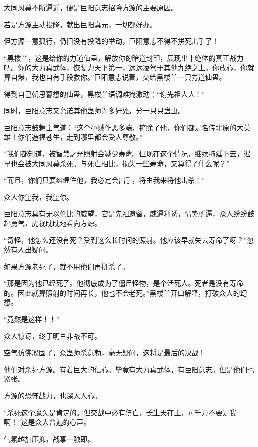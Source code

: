 
\begin{this_body}

大同风幕不断逼近，便是巨阳意志招降方源的主要原因。

若是方源主动投降，献出巨阳真元，一切都好办。

但方源一意孤行，仍旧没有投降的举动，巨阳意志不得不拼死出手了！

“黑楼兰，这是给你的力道仙蛊，解放你的暗道封印，展现出十绝体的真正战力吧。你的大力真武体，恢复力天下第一，远远凌驾于其他九绝之上。你放心，你就算自爆，我也自有手段救你。”巨阳意志说着，交给黑楼兰一只力道仙蛊。

得到自己朝思暮想的仙蛊，黑楼兰语调难掩激动：“谢先祖大人！”

同时，巨阳意志又允诺其他蛊师许多好处，分一只只蛊虫。

巨阳意志鼓舞士气道：“这个小贼作恶多端，铲除了他，你们都是名传北原的大英雄！你们造福苍生，走到哪里都会受人尊敬。”

“我们都知道，被智慧之光照射会减少寿命。但现在这个情况，继续拖延下去，迟早也会被大同风幕杀死。与死亡相比，损失一些寿命，又算得了什么呢？”

“而且，你们只要纠缠住他，我必定会出手，将由我来将他击杀！”

众人你望我，我望你。

巨阳意志具有无以伦比的威望，它是先祖遗留，威逼利诱，情势所逼，众人纷纷鼓起勇气，虎视眈眈地看向方源。

“奇怪，他怎么还没有死？受到这么长时间的照射。他应该早就失去寿命了呀？”忽然有人出疑问。

如果方源老死了，就不用他们再拼杀了。

“那是因为他已经死了。他彻底成为了僵尸怪物，是个活死人。死者是没有寿命的。因此就算照射的时间再长，他也不会老死。”黑楼兰开口解释，打破众人的幻想。

“竟然是这样！！”

众人惊讶，终于明白非战不可。

空气仿佛凝固了，众蛊师杀意勃，毫无疑问，这将是最后的决战！

他们对杀死方源。有着巨大的信心。毕竟有大力真武体，有巨阳意志。但是他们也紧张。

方源的恐怖战力，也深入人心。

“杀死这个魔头是肯定的。但交战中必有伤亡，长生天在上，可千万不要是我啊！”这是众人普遍的心声。

气氛越加压抑，战事一触即。


\end{this_body}

